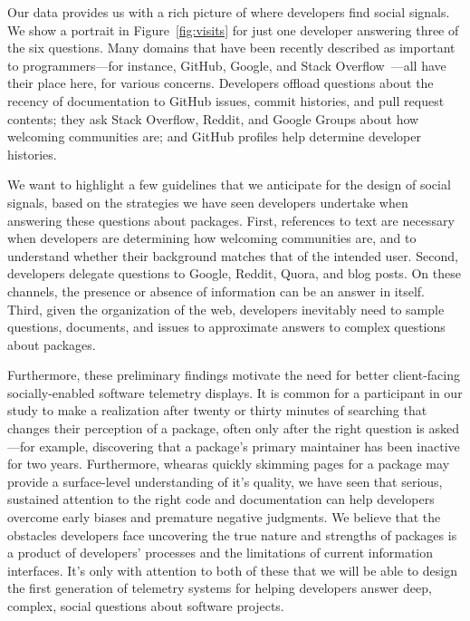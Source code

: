 Our data provides us with a rich picture of where developers find social signals.
We show a portrait in Figure~\ref{fig:visits} for just one developer answering three of the six questions.
Many domains that have been recently described as important to programmers---for instance, GitHub, Google, and Stack Overflow~\cite{storey_revolution_2014}---all have their place here, for various concerns.
Developers offload questions about the recency of documentation to GitHub issues, commit histories, and pull request contents;
they ask Stack Overflow, Reddit, and Google Groups about how welcoming communities are;
and GitHub profiles help determine developer histories.

We want to highlight a few guidelines that we anticipate for the design of social signals, based on the strategies we have seen developers undertake when answering these questions about packages.
First, references to text are necessary when developers are determining how welcoming communities are, and to understand whether their background matches that of the intended user.
Second, developers delegate questions to Google, Reddit, Quora, and blog posts.
On these channels, the presence or absence of information can be an answer in itself.
Third, given the organization of the web, developers inevitably need to sample questions, documents, and issues to approximate answers to complex questions about packages.

Furthermore, these preliminary findings motivate the need for better client-facing socially-enabled software telemetry displays.
It is common for a participant in our study to make a realization after twenty or thirty minutes of searching that changes their perception of a package, often only after the right question is asked---for example, discovering that a package's primary maintainer has been inactive for two years.
Furthermore, whearas quickly skimming pages for a package may provide a surface-level understanding of it's quality, we have seen that serious, sustained attention to the right code and documentation can help developers overcome early biases and premature negative judgments.
We believe that the obstacles developers face uncovering the true nature and strengths of packages is a product of developers' processes and the limitations of current information interfaces.
It's only with attention to both of these that we will be able to design the first generation of telemetry systems for helping developers answer deep, complex, social questions about software projects.

